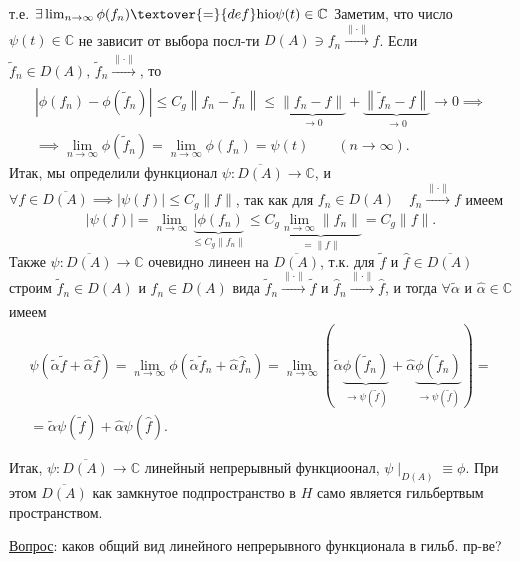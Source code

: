 т.\:е. $\exists \lim_{n \to \infty}\phi(f_n) \textover{=}{def} 
\mathrm{hi o}
\psi (t) \in \mathbb{C}$
Заметим, что число $\psi(t) \in \mathbb{C}$ не зависит от
выбора посл-ти $D(A) \ni f_n \xrightarrow[]{\| \cdot\|}f$.
Если $\tilde{f}_n \in D(A),\,\tilde{f}_n \xrightarrow[]{\| \cdot\|}$,
то
\begin{multline*}
	\left|\phi(f_n)- \phi \left( \tilde{f}_n \right) \right|
	\le  C_g \left\lVert  f_n - \tilde{f}_n\right\rVert\le 
	\underbrace{\| f_n - f\|}_{\to 0}+
	\underbrace{\left\lVert \tilde{f}_n - f\right\rVert}_{\to 0}\to 0 \implies \\ \implies
	\lim_{n \to \infty} \phi\left(\tilde{f}_n\right)=
	\lim_{n \to \infty} \phi(f_n) = \psi(t) \qquad
	(n\to  \infty)
.\end{multline*} 
Итак, мы определили функционал $\psi: \overline{D(A)}\to \mathbb{C}$, и $\forall f \in  \overline{D(A)} \implies |\psi(f)|\le 
 C_g \| f\|$, так как для $f_n \in D(A)\quad f_n \xrightarrow[]{\| \cdot\|} f $ имеем
 \[
	 |\psi(f)|= \lim_{n \to \infty} \underbrace{|\phi(f_n)}_{\le 
	 C_g \| f_n\|}\le C_g \underbrace{\lim_{n \to \infty} \| f_n\|}_{= \| f\|}=C_g \| f\|
 .\] 
 Также $\psi : \overline{D(A)}\to  \mathbb{C}$ очевидно линеен
 на $\overline{D(A)}$, т.\:к. для $\tilde{f}$ и $\hat{f} \in 
 \overline{D(A)}$ строим $\tilde{f}_n \in D(A)$ и 
 $\hat{f}_n \in D(A)$ вида 
 $\tilde{f}_n \xrightarrow[]{\| \cdot \|}\tilde{f}$ и $
 \hat{f}_n \xrightarrow[]{\| \cdot \|}\hat{f}$,
 и тогда $\forall \tilde{\alpha}$ и $\hat{\alpha}\in \mathbb{C}$
 имеем
\begin{multline*}
	\psi\left( \tilde{\alpha} \tilde{f}+ \hat{\alpha}
	\hat{f}\right) = \lim_{n \to \infty} \phi\left( 
\tilde{\alpha}\tilde{f}_n+ \hat{\alpha}\hat{f}_n\right) =
\lim_{n \to \infty} \left( \tilde{\alpha}\underbrace{
\phi\left( \tilde{f}_n \right) }_{\to \psi\left( \tilde{f} \right) }+\hat{\alpha} \underbrace{\phi\left( \tilde{f}_n \right) }_{\to 
\psi\left( \tilde{f} \right) } \right) =\\=
\tilde{\alpha} \psi\left( \tilde{f} \right) +
\hat{\alpha} \psi\left( \hat{f} \right) 
.\end{multline*} 

Итак, $\psi: \overline{D(A)}\to \mathbb{C}$ линейный
непрерывный функциоонал, $\psi\mid _{D(A)}\equiv \phi$.
При этом $\overline{D(A)}$ как замкнутое подпространство в $H$ 
само является гильбертвым пространством.

\underline{Вопрос}: каков общий вид линейного непрерывного функционала в гильб. пр-ве?

